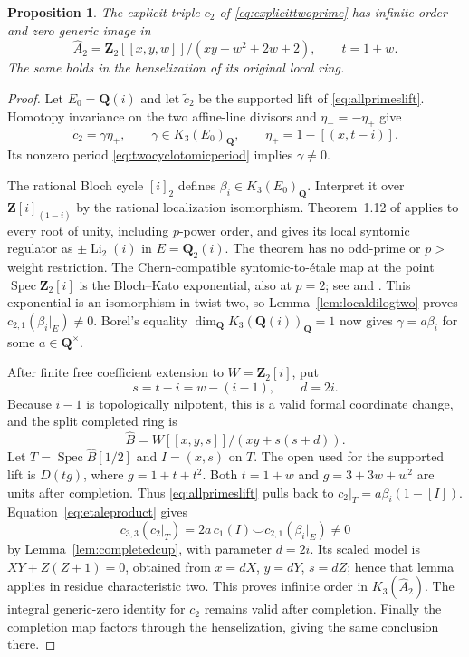 \documentclass[11pt,a4paper]{article}
\newtheorem{proposition}[theorem]{Proposition}
\theoremstyle{remark}
\newcommand{\Q}{\mathbf Q}
\newcommand{\Z}{\mathbf Z}
\newcommand{\Spec}{\operatorname{Spec}}
\begin{document}
\begin{proposition}\label{prop:explicittwocomplete}
The explicit triple $c_2$ of \eqref{eq:explicittwoprime} has
infinite order and zero generic image in
\[
 \widehat A_2
 =\Z_2[[x,y,w]]/(xy+w^2+2w+2),\qquad t=1+w.
\]
The same holds in the henselization of its original local ring.
\end{proposition}
\begin{proof}
Let $E_0=\Q(i)$ and let $\widetilde c_2$ be the supported lift
of \eqref{eq:allprimeslift}. Homotopy invariance on the two
affine-line divisors and $\eta_-=-\eta_+$ give
\[
 \widetilde c_2=\gamma\eta_+,\qquad
 \gamma\in K_3(E_0)_{\Q},\qquad
 \eta_+=1-[(x,t-i)].
\]
Its nonzero period \eqref{eq:twocyclotomicperiod} implies
$\gamma\ne0$.

The rational Bloch cycle $[i]_2$ defines
$\beta_i\in K_3(E_0)_{\Q}$. Interpret it over
$\Z[i]_{(1-i)}$ by the rational localization isomorphism.
Theorem~1.12 of \cite{BesserDeJeu} applies to every root of unity,
including $p$-power order, and gives its local syntomic regulator
as $\pm\operatorname{Li}_2(i)$ in $E=\Q_2(i)$.
The theorem has no odd-prime or $p>$weight restriction.
The Chern-compatible syntomic-to-\'etale map at the point
$\Spec\Z_2[i]$ is the Bloch--Kato exponential, also at $p=2$;
see \cite[Example~2.2.4 and Propositions~2.2.7, 2.3.4]{HuberKings}
and \cite[Corollary~5.19 and its proof]{Tamme}.
This exponential is an isomorphism in twist two, so
Lemma~\ref{lem:localdilogtwo} proves
$c_{2,1}(\beta_i|_E)\ne0$.
Borel's equality $\dim_{\Q}K_3(\Q(i))_{\Q}=1$ now gives
$\gamma=a\beta_i$ for some $a\in\Q^\times$.

After finite free coefficient extension to $W=\Z_2[i]$, put
\[
 s=t-i=w-(i-1),\qquad d=2i.
\]
Because $i-1$ is topologically nilpotent, this is a valid formal
coordinate change, and the split completed ring is
\[
 \widehat B=W[[x,y,s]]/(xy+s(s+d)).
\]
Let $T=\Spec\widehat B[1/2]$ and $I=(x,s)$ on $T$.
The open used for the supported lift is $D(tg)$,
where $g=1+t+t^2$. Both $t=1+w$ and
$g=3+3w+w^2$ are units after completion. Thus
\eqref{eq:allprimeslift} pulls back to
$c_2|_T=a\beta_i(1-[I])$.
Equation~\eqref{eq:etaleproduct} gives
\[
 c_{3,3}(c_2|_T)
 =2a\,c_1(I)\smile c_{2,1}(\beta_i|_E)\ne0
\]
by Lemma~\ref{lem:completedcup}, with parameter $d=2i$.
Its scaled model is $XY+Z(Z+1)=0$, obtained from
$x=dX$, $y=dY$, $s=dZ$; hence that lemma applies in residue
characteristic two.
This proves infinite order in $K_3(\widehat A_2)$.
The integral generic-zero identity for $c_2$ remains valid after
completion. Finally the completion map factors through the
henselization, giving the same conclusion there.
\end{proof}
\end{document}
